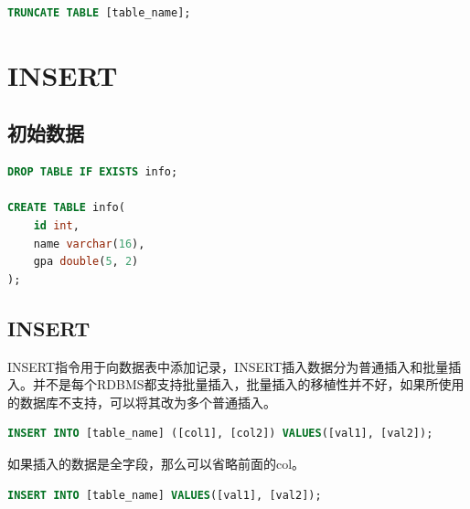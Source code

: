 \documentclass[12pt, openany, oneside]{book}
\begin{document}
\vspace{-0.5cm}

\begin{lstlisting}[language=SQL]
TRUNCATE TABLE [table_name];
\end{lstlisting}

\newpage

\chapter{INSERT}

\section{初始数据}


\begin{lstlisting}[language=SQL]
DROP TABLE IF EXISTS info;

CREATE TABLE info(
    id int,
    name varchar(16),
    gpa double(5, 2)
);
\end{lstlisting}

\vspace{0.5cm}

\section{INSERT}

INSERT指令用于向数据表中添加记录，INSERT插入数据分为普通插入和批量插入。并不是每个RDBMS都支持批量插入，批量插入的移植性并不好，如果所使用的数据库不支持，可以将其改为多个普通插入。

\vspace{-0.5cm}

\begin{lstlisting}[language=SQL]
INSERT INTO [table_name] ([col1], [col2]) VALUES([val1], [val2]);
\end{lstlisting}

如果插入的数据是全字段，那么可以省略前面的col。

\vspace{-0.5cm}

\begin{lstlisting}[language=SQL]
INSERT INTO [table_name] VALUES([val1], [val2]);
\end{lstlisting}

\vspace{0.5cm}

\\
\end{document}
